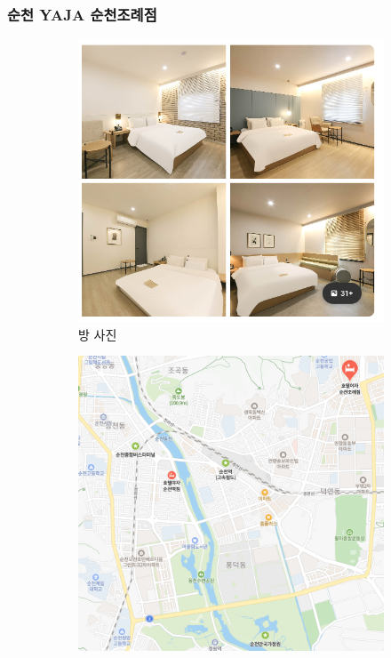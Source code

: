 \documentclass[10pt]{article}
\begin{document}
\subsubsection{순천 YAJA 순천조례점}
\begin{figure}[htbp]
  \centering
  \begin{subfigure}{0.3\textwidth}
    \centering
    \includegraphics[width=\linewidth]{fig/8_방.png}
    \caption{방 사진}
    \label{fig:1}
  \end{subfigure}
  \hfill
  \begin{subfigure}{0.3\textwidth}
    \centering
    \includegraphics[width=\linewidth]{fig/8_위치.png}

\end{subfigure}
\end{figure}
\end{document}
